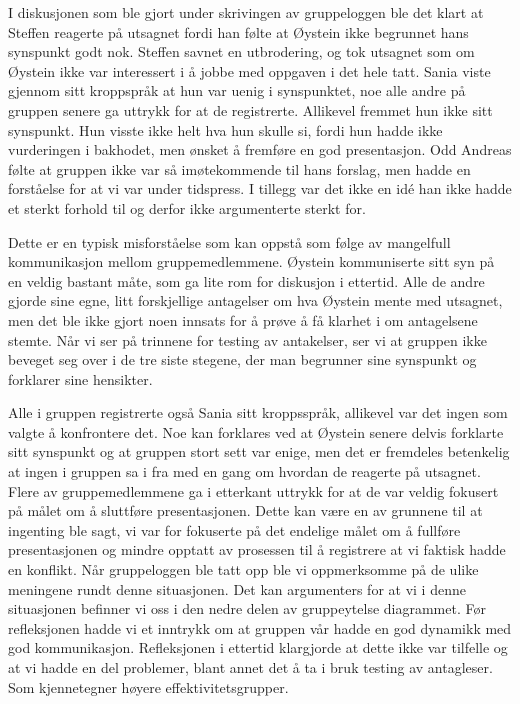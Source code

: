 \documentclass[a4paper,norsk,oneside]{article}
\begin{document}
I diskusjonen som ble gjort under skrivingen av gruppeloggen ble det klart at Steffen reagerte på utsagnet fordi han følte at Øystein ikke begrunnet hans synspunkt godt nok. Steffen savnet en utbrodering, og tok utsagnet som om Øystein ikke var interessert i å jobbe med oppgaven i det hele tatt. Sania viste gjennom sitt kroppspråk at hun var uenig i synspunktet, noe alle andre på gruppen senere ga uttrykk for at de registrerte. Allikevel fremmet hun ikke sitt synspunkt. Hun visste ikke helt hva hun skulle si, fordi hun hadde ikke vurderingen i bakhodet, men ønsket å fremføre en god presentasjon. Odd Andreas følte at gruppen ikke var så imøtekommende til hans forslag, men hadde en forståelse for at vi var under tidspress. I tillegg var det ikke en idé han ikke hadde et sterkt forhold til og derfor ikke argumenterte sterkt for.

Dette er en typisk misforståelse som kan oppstå som følge av mangelfull kommunikasjon mellom gruppemedlemmene. Øystein kommuniserte sitt syn på en veldig bastant måte, som ga lite rom for diskusjon i ettertid. Alle de andre gjorde sine egne, litt forskjellige antagelser om hva Øystein mente med utsagnet, men det ble ikke gjort noen innsats for å prøve å få klarhet i om antagelsene stemte. Når vi ser på trinnene for testing av antakelser, ser vi at gruppen ikke beveget seg over i de tre siste stegene, der man begrunner sine synspunkt og forklarer sine hensikter.

Alle i gruppen registrerte også Sania sitt kroppsspråk, allikevel var det ingen som valgte å konfrontere det. Noe kan forklares ved at Øystein senere delvis forklarte sitt synspunkt og at gruppen stort sett var enige, men det er fremdeles betenkelig at ingen i gruppen sa i fra med en gang om hvordan de reagerte på utsagnet. Flere av gruppemedlemmene ga i etterkant uttrykk for at de var veldig fokusert på målet om å sluttføre presentasjonen. Dette kan være en av grunnene til at ingenting ble sagt, vi var for fokuserte på det endelige målet om å fullføre presentasjonen og mindre opptatt av prosessen til å registrere at vi faktisk hadde en konflikt. Når gruppeloggen ble tatt opp ble vi oppmerksomme på de ulike meningene rundt denne situasjonen. Det kan argumenters for at vi i denne situasjonen befinner vi oss i den nedre delen av gruppeytelse diagrammet. Før refleksjonen hadde vi et inntrykk om at gruppen vår hadde en god dynamikk med god kommunikasjon. Refleksjonen i ettertid klargjorde at dette ikke var tilfelle og at vi hadde en del problemer, blant annet det å ta i bruk testing av antagleser. Som kjennetegner høyere effektivitetsgrupper.
\end{document}
